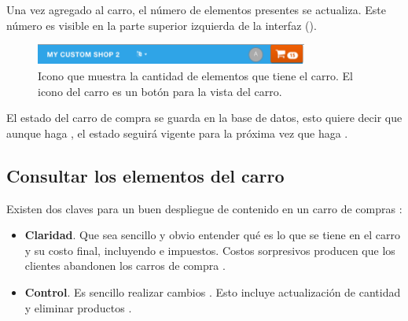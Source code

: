 		Una vez agregado al carro, el número de elementos presentes se actualiza. Este número es visible en la parte superior izquierda de la interfaz ().

		\begin{figure}[H]
			\centering
			\includegraphics[width=0.8\textwidth]{figuras/header/toolbar/ui.png}
			\caption{Icono que muestra la cantidad de elementos que tiene el carro. El icono del carro es un botón para la vista del carro.}
			\label{figure:solution:cart:header}
		\end{figure}

		El estado del carro de compra se guarda en la base de datos, esto quiere decir que aunque haga \logoutCPT, el estado seguirá vigente para la próxima vez que haga \loginUpperCPT.


	\subsection{Consultar los elementos del carro}\label{chapter:section:carro_compra:subsection:request}



		Existen dos claves para un buen despliegue de contenido en un carro de compras \cite{online_official_conversionxl_checkout_flow}:
		\begin{itemize}
			\item
				\textbf{Claridad}. Que sea sencillo y obvio entender qué es lo que se tiene en el carro y su costo final, incluyendo \shipping e impuestos. Costos sorpresivos producen que los clientes abandonen los carros de compra \cite{online_official_conversionxl_checkout_flow}.
			\item
				\textbf{Control}. Es sencillo realizar cambios \cite{online_official_conversionxl_checkout_flow}. Esto incluye actualización de cantidad y eliminar productos \cite{online_official_conversionxl_shopping_cart_abandonment}.
		\end{itemize}

